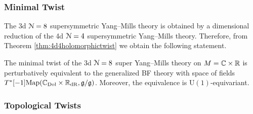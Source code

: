 \documentclass[10pt, oneside]{article}
\renewcommand{\U}{\mathrm{U}}
\begin{document}
\subsubsection{Minimal Twist}
\label{sect:3d8minimal_twist}

The 3d $\mathcal N=8$ supersymmetric Yang--Mills theory is obtained by a dimensional reduction of the 4d $\mathcal{N}=4$ supersymmetric Yang--Mills theory. Therefore, from Theorem \ref{thm:4d4holomorphictwist} we obtain the following statement.

\begin{theorem}  \label{3d_8_minimal_twist_thm}
The minimal twist of the 3d $\mathcal N=8$ super Yang--Mills theory on $M=\mathbb C\times \mathbb R$ is perturbatively equivalent to the generalized BF theory with space of fields $T^*[-1]\mathrm{Map}(\mathbb C_{\rm Dol} \times \mathbb R_{\mathrm{dR}}, \mathfrak g/\mathfrak g)$. Moreover, the equivalence is $\U(1)$-equivariant.
\end{theorem}


\subsubsection{Topological Twists}
\end{document}
